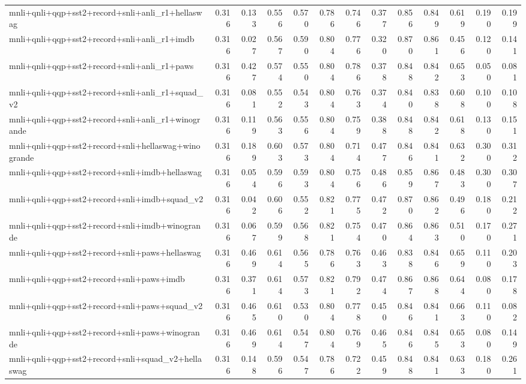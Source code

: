\begin{table}[t]
\begin{tabular}{lrrrrrrrrrrrr}
    mnli+qnli+qqp+sst2+record+snli+anli\_r1+hellaswag & 0.316 & 0.133 & 0.556 & 0.570 & 0.786 & 0.746 & 0.377 & 0.856 & 0.849 & 0.619 & 0.190 & 0.199 \\
    mnli+qnli+qqp+sst2+record+snli+anli\_r1+imdb & 0.316 & 0.027 & 0.567 & 0.590 & 0.804 & 0.776 & 0.320 & 0.870 & 0.861 & 0.456 & 0.120 & 0.141 \\
    mnli+qnli+qqp+sst2+record+snli+anli\_r1+paws & 0.316 & 0.427 & 0.574 & 0.550 & 0.804 & 0.786 & 0.378 & 0.848 & 0.842 & 0.653 & 0.050 & 0.081 \\
    mnli+qnli+qqp+sst2+record+snli+anli\_r1+squad\_v2 & 0.316 & 0.081 & 0.552 & 0.543 & 0.804 & 0.763 & 0.374 & 0.840 & 0.838 & 0.608 & 0.100 & 0.108 \\
    mnli+qnli+qqp+sst2+record+snli+anli\_r1+winogrande & 0.316 & 0.119 & 0.563 & 0.556 & 0.804 & 0.759 & 0.388 & 0.848 & 0.842 & 0.618 & 0.130 & 0.151 \\
    mnli+qnli+qqp+sst2+record+snli+hellaswag+winogrande & 0.316 & 0.189 & 0.603 & 0.573 & 0.804 & 0.714 & 0.477 & 0.846 & 0.841 & 0.632 & 0.300 & 0.312 \\
    mnli+qnli+qqp+sst2+record+snli+imdb+hellaswag & 0.316 & 0.054 & 0.596 & 0.593 & 0.804 & 0.756 & 0.486 & 0.859 & 0.867 & 0.483 & 0.300 & 0.307 \\
    mnli+qnli+qqp+sst2+record+snli+imdb+squad\_v2 & 0.316 & 0.042 & 0.606 & 0.552 & 0.821 & 0.775 & 0.472 & 0.870 & 0.862 & 0.496 & 0.180 & 0.212 \\
    mnli+qnli+qqp+sst2+record+snli+imdb+winogrande & 0.316 & 0.067 & 0.599 & 0.568 & 0.821 & 0.754 & 0.470 & 0.864 & 0.863 & 0.510 & 0.170 & 0.271 \\
    mnli+qnli+qqp+sst2+record+snli+paws+hellaswag & 0.316 & 0.469 & 0.614 & 0.565 & 0.786 & 0.763 & 0.463 & 0.838 & 0.846 & 0.659 & 0.110 & 0.203 \\
    mnli+qnli+qqp+sst2+record+snli+paws+imdb & 0.316 & 0.371 & 0.614 & 0.573 & 0.821 & 0.792 & 0.474 & 0.867 & 0.868 & 0.644 & 0.080 & 0.178 \\
    mnli+qnli+qqp+sst2+record+snli+paws+squad\_v2 & 0.316 & 0.465 & 0.610 & 0.530 & 0.804 & 0.778 & 0.450 & 0.846 & 0.841 & 0.663 & 0.110 & 0.082 \\
    mnli+qnli+qqp+sst2+record+snli+paws+winogrande & 0.316 & 0.469 & 0.614 & 0.547 & 0.804 & 0.769 & 0.465 & 0.846 & 0.845 & 0.653 & 0.080 & 0.149 \\
    mnli+qnli+qqp+sst2+record+snli+squad\_v2+hellaswag & 0.316 & 0.148 & 0.596 & 0.547 & 0.786 & 0.722 & 0.459 & 0.848 & 0.841 & 0.633 & 0.180 & 0.261 \\

\end{tabular}
\end{table}
